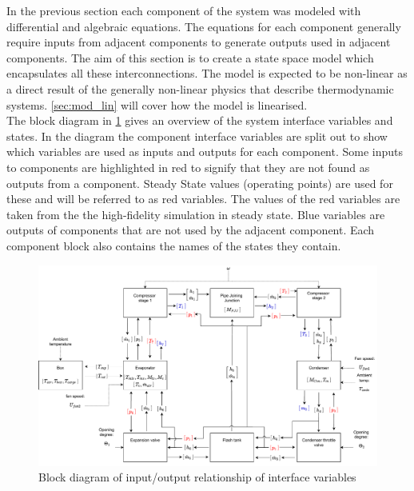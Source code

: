 
In the previous section each component of the system was modeled with differential and algebraic equations. The equations for each component generally require inputs from adjacent components to generate outputs used in adjacent components. The aim of this section is to create a state space model which encapsulates all these interconnections. The model is expected to be non-linear as a direct result of the generally non-linear physics that describe thermodynamic systems. \cref{sec:mod_lin} will cover how the model is linearised.\\

The block diagram in \cref{fig:Block_diagram_inout} gives an overview of the system interface variables and states. In the diagram the component interface variables are split out to show which variables are used as inputs and outputs for each component. Some inputs to components are highlighted in red to signify that they are not found as outputs from a component. Steady State values (operating points) are used for these and will be referred to as red variables. The values of the red variables are taken from the the high-fidelity simulation in steady state. Blue variables are outputs of components that are not used by the adjacent component. Each component block also contains the names of the states they contain.

\begin{figure}[h!]
	\centering
	\includegraphics[width=1\textwidth]{Graphics/Block_Diagram_inout_flowValveVersion.pdf}
	\caption{Block diagram of input/output relationship of interface variables}
	\label{fig:Block_diagram_inout}
\end{figure}

